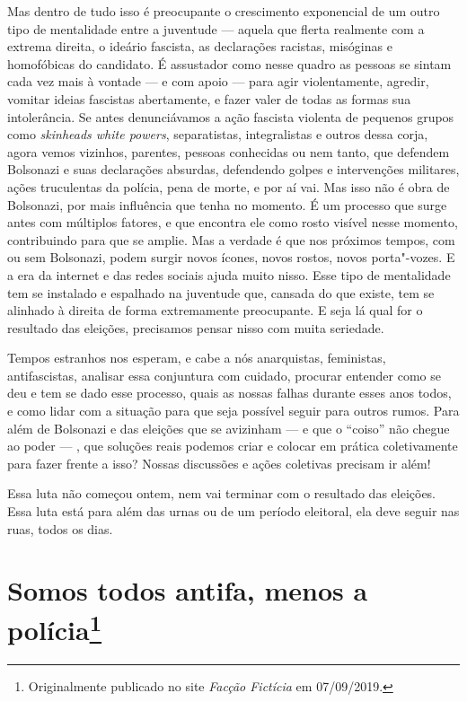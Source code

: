 Mas dentro de tudo isso é preocupante o crescimento exponencial de um outro tipo de mentalidade entre a juventude --- aquela que flerta realmente com a extrema direita, o ideário fascista, as declarações racistas, misóginas e homofóbicas do candidato. É assustador como nesse quadro as pessoas se sintam cada vez mais à vontade --- e com apoio --- para agir violentamente, agredir, vomitar ideias fascistas abertamente, e fazer valer de todas as formas sua intolerância. Se antes denunciávamos a ação fascista violenta de pequenos grupos como \emph{skinheads white powers}, separatistas, integralistas e outros dessa corja, agora vemos vizinhos, parentes, pessoas conhecidas ou nem tanto, que defendem Bolsonazi e suas declarações absurdas, defendendo golpes e intervenções militares, ações truculentas da polícia, pena de morte, e por aí vai. Mas isso não é obra de Bolsonazi, por mais influência que tenha no momento. É um processo que surge antes com múltiplos fatores, e que encontra ele como rosto visível nesse momento, contribuindo para que se amplie. Mas a verdade é que nos próximos tempos, com ou sem Bolsonazi, podem surgir novos ícones, novos rostos, novos porta"-vozes. E a era da internet e das redes sociais ajuda muito nisso. Esse tipo de mentalidade tem se instalado e espalhado na juventude que, cansada do que existe, tem se alinhado à direita de forma extremamente preocupante. E seja lá qual for o resultado das eleições, precisamos pensar nisso com muita seriedade.

Tempos estranhos nos esperam, e cabe a nós anarquistas, feministas, antifascistas, analisar essa conjuntura com cuidado, procurar entender como se deu e tem se dado esse processo, quais as nossas falhas durante esses anos todos, e como lidar com a situação para que seja possível seguir para outros rumos. Para além de Bolsonazi e das eleições que se avizinham --- e que o ``coiso'' não chegue ao poder --- , que soluções reais podemos criar e colocar em prática coletivamente para fazer frente a isso? Nossas discussões e ações coletivas precisam ir além!

Essa luta não começou ontem, nem vai terminar com o resultado das eleições. Essa luta está para além das urnas ou de um período eleitoral, ela deve seguir nas ruas, todos os dias.

\chapter*{Somos todos antifa, menos a polícia\footnote[*]{Originalmente publicado no site \emph{Facção Fictícia} em 07/09/2019.}}


